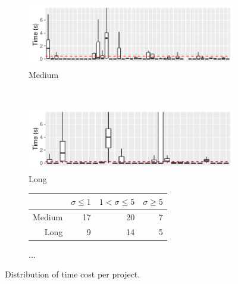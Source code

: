 \begin{figure}[ht]
    \centering

    \begin{subfigure}{0.5\textwidth}
      \centering
      \includegraphics[width=\textwidth]{R/testcost-med.pdf}
      \caption{\label{fig:medtcost}Medium}
    \end{subfigure}\\
    
    \begin{subfigure}{0.5\textwidth}
      \centering
      \includegraphics[width=\textwidth]{R/testcost-long.pdf}
      \caption{\label{fig:longtcost}Long}
    \end{subfigure}%
    
    \begin{subfigure}{0.5\textwidth}
      \centering
      \begin{tabular}{rrrr}
        \toprule
        & $\sigma\leq1$ & $1<\sigma\leq5$ & $\sigma\ge5$ \\
        \midrule    
        Medium & 17 & 20 & 7 \\
        Long   &  9 & 14 & 5 \\
        \bottomrule
      \end{tabular}
      \caption{\label{fig:sd}...}    
    \end{subfigure}%

    \caption{\label{fig:time-distributions}Distribution of time cost per project.}    
\end{figure}


